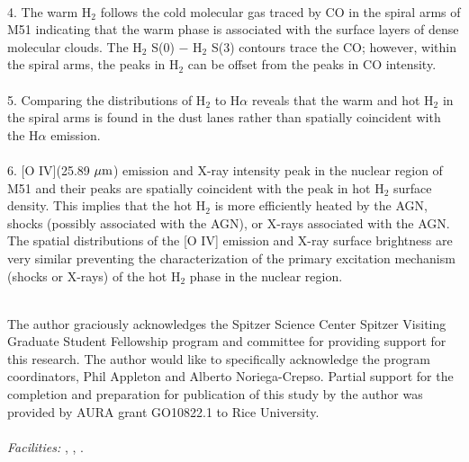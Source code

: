 \documentclass[manuscript]{aastex}
\begin{document}
\\
4. The warm H$_2$ follows the cold molecular gas traced by CO 
in the spiral arms of M51 indicating that the warm phase is associated 
with the surface layers of dense molecular clouds.  The H$_2$ S(0) $-$
H$_2$ S(3) contours trace the CO; however, within the spiral
arms, the peaks in H$_2$ can be offset from the peaks in CO
intensity.\\
\\
5.  Comparing the distributions of H$_2$ to H$\alpha$ reveals
that the warm and hot H$_2$ in the spiral arms is found in the dust lanes
rather than spatially coincident with the H$\alpha$ emission.\\
\\
6.  [O IV](25.89 $\mbox{$\mu$m}$) emission and X-ray
intensity peak in the nuclear region of M51 and their 
peaks are spatially coincident with the peak in hot H$_2$ 
surface density.  This implies that the hot H$_2$ 
is more efficiently heated by the AGN, shocks (possibly associated
with the AGN), or X-rays associated with the AGN.  The spatial
distributions of the [O IV] emission and X-ray surface brightness are
very similar preventing the characterization of the primary excitation 
mechanism (shocks or X-rays) of the hot H$_2$ phase in the nuclear region.\\ 
\\

\acknowledgments

The author graciously acknowledges the Spitzer Science Center Spitzer
Visiting Graduate Student Fellowship program and committee for
providing support for this research.  The author would like to
specifically acknowledge the program coordinators, Phil Appleton and
Alberto Noriega-Crepso. 
Partial support for the completion and preparation for publication of this study by the
author was provided by AURA grant GO10822.1 to Rice
University.\\ 
\\
{\it Facilities:} , ,
.
\end{document}
